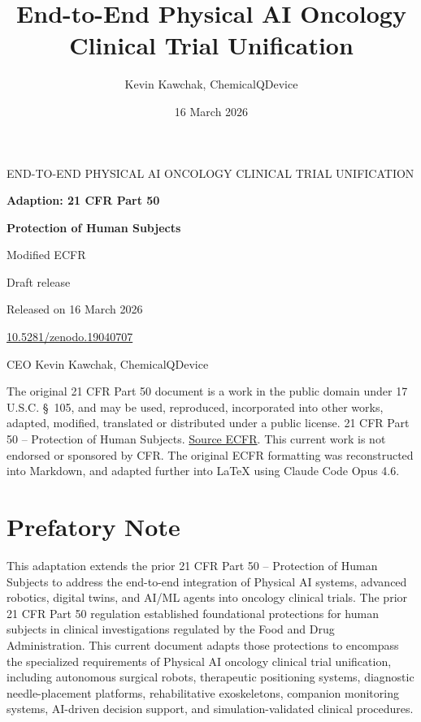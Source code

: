 \documentclass[11pt]{article}
\title{End-to-End Physical AI Oncology Clinical Trial Unification}
\author{Kevin Kawchak, ChemicalQDevice}
\date{16 March 2026}
\begin{document}
\begin{titlepage}
\centering
{\Large END-TO-END PHYSICAL AI ONCOLOGY CLINICAL TRIAL UNIFICATION\par}
\vspace{1.5cm}
{\Huge\bfseries Adaption: 21 CFR Part 50\par}
\vspace{0.5cm}
{\LARGE\bfseries Protection of Human Subjects\par}
\vspace{0.3cm}
{\Large Modified ECFR\par}
\vspace{0.8cm}
{\large Draft release\par}
\vspace{0.2cm}
{\large Released on 16 March 2026\par}
\vspace{0.2cm}
{\large \href{https://doi.org/10.5281/zenodo.19040707}{10.5281/zenodo.19040707}\par}
\vspace{0.2cm}
{\large CEO Kevin Kawchak, ChemicalQDevice\par}
\vfill
{\small The original 21 CFR Part 50 document is a work in the public domain under 17 U.S.C. \S~105, and may be used, reproduced, incorporated into other works, adapted, modified, translated or distributed under a public license. 21 CFR Part 50 -- Protection of Human Subjects. \href{https://www.ecfr.gov/current/title-21/chapter-I/subchapter-A/part-50}{Source ECFR}. This current work is not endorsed or sponsored by CFR. The original ECFR formatting was reconstructed into Markdown, and adapted further into LaTeX using Claude Code Opus 4.6.\par}
\end{titlepage}

\tableofcontents
\clearpage
\section*{Prefatory Note}

This adaptation extends the prior 21 CFR Part 50 -- Protection of Human Subjects to address the end-to-end integration of Physical AI systems, advanced robotics, digital twins, and AI/ML agents into oncology clinical trials. The prior 21 CFR Part 50 regulation established foundational protections for human subjects in clinical investigations regulated by the Food and Drug Administration. This current document adapts those protections to encompass the specialized requirements of Physical AI oncology clinical trial unification, including autonomous surgical robots, therapeutic positioning systems, diagnostic needle-placement platforms, rehabilitative exoskeletons, companion monitoring systems, AI-driven decision support, and simulation-validated clinical procedures.
\end{document}

